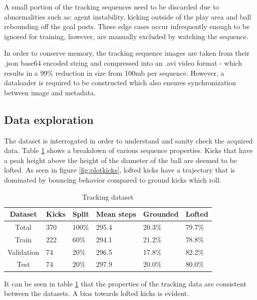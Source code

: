 \documentclass[a4paper,twoside,12pt]{report}
\begin{document}
A small portion of the tracking sequences need to be discarded due to abnormalities such as: agent instability, kicking outside of the play area and ball rebounding off the goal posts. These edge cases occur infrequently enough to be ignored for training, however, are manually excluded by watching the sequence. 

In order to conserve memory, the tracking sequence images are taken from their .json base64 encoded string and compressed into an .avi video format - which results in a 99\% reduction in size from 100mb per sequence. However, a dataloader is required to be constructed which also ensures synchronization between image and metadata.

\subsection{Data exploration}

The dataset is interrogated in order to understand and sanity check the acquired data. Table \ref{tab:tracking} shows a breakdown of various sequence properties. Kicks that have a peak height above the height of the diameter of the ball are deemed to be lofted. As seen in figure \ref{fig:plotkicks}, lofted kicks have a trajectory that is dominated by bouncing behavior compared to ground kicks which roll.

\begin{table}[h!]
\fontsize{9.5pt}{12pt}\selectfont
\centering
\begin{tabular}{c|ll|l|ll}
{\bf Dataset}	&{\bf Kicks}	&{\bf Split}	&{\bf Mean steps}	&{\bf Grounded}	&{\bf Lofted}	\\\hline
Total			&370			&100\%			&295.4			&20.3\%			&79.7\%			\\\hline   
Train			&222			&60\%			&294.1			&21.2\%			&78.8\%			\\\hline  
Validation		&74				&20\%			&296.5			&17.8\%			&82.2\%			\\\hline  
Test			&74				&20\%			&297.9			&20.0\%			&80.0\%			\\\hline                        
\end{tabular}
\caption{Tracking dataset}
\label{tab:tracking}
\end{table}

It can be seen in table \ref{tab:tracking} that the properties of the tracking data are consistent between the datasets. A bias towards lofted kicks is evident.
\end{document}
